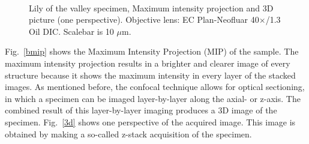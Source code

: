 \begin{figure}[h]
\centering
{}\hspace{0.1em}
\\
\caption{Lily of the valley specimen, Maximum intensity projection and 3D picture (one perspective). 
Objective lens: EC Plan-Neofluar 40$\times$/1.3 Oil DIC. 
Scalebar is 10 $\mu$m.} 
\label{fig:LSMmip3d}
\end{figure}

Fig.~\ref{bmip} shows the Maximum Intensity Projection (MIP) of the sample. 
The maximum intensity projection results in a brighter and clearer image of every structure because it shows the maximum intensity in every layer of the stacked images. 
As mentioned before, the confocal technique allows for optical sectioning, in which a specimen can be imaged layer-by-layer along the axial- or z-axis. 
The combined result of this layer-by-layer imaging produces a 3D image of the specimen. 
Fig.~\ref{3d} shows one perspective of the acquired image. 
This image is obtained by making a so-called z-stack acquisition of the specimen. 

